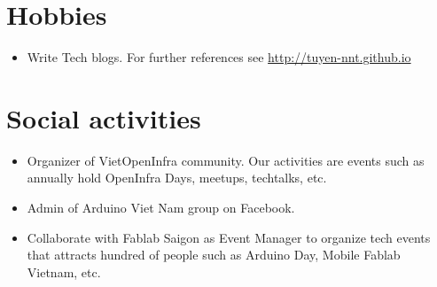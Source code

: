 \documentclass[letterpaper,11pt]{article}
\newcommand{\resumeItemNornal}[1]{
  \item\small{
    {#1 \vspace{-2pt}}
  }
}
\newcommand{\resumeSubItemNormal}[1]{\resumeItemNornal{#1}\vspace{-4pt}}
\newcommand{\resumeSubHeadingListStart}{\begin{itemize}[leftmargin=*]}
\newcommand{\resumeSubHeadingListEnd}{\end{itemize}}
\begin{document}
 \section{Hobbies}
  \resumeSubHeadingListStart
    \resumeSubItemNormal
      {Write Tech blogs. For further references see \url{http://tuyen-nnt.github.io}}
\resumeSubHeadingListEnd

\section{Social activities}
  \resumeSubHeadingListStart
    \resumeSubItemNormal
      {Organizer of VietOpenInfra community. Our activities are events such as annually hold OpenInfra Days, meetups, techtalks, etc.}
    \resumeSubItemNormal
      {Admin of Arduino Viet Nam group on Facebook.}
    \resumeSubItemNormal
      {Collaborate with Fablab Saigon as Event Manager to organize tech events that attracts hundred of people such as Arduino Day, Mobile Fablab Vietnam, etc.}
\resumeSubHeadingListEnd



\end{document}
